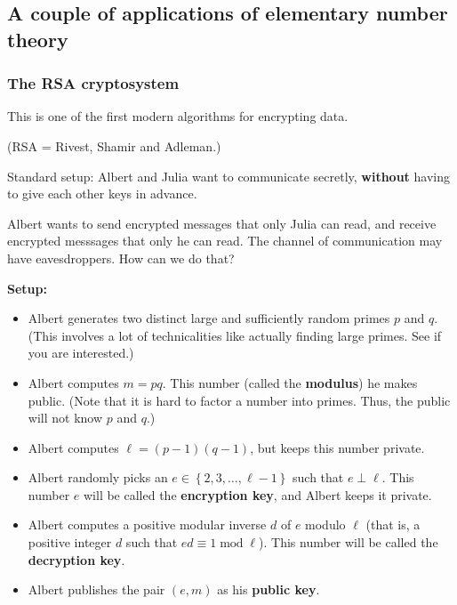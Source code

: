 \documentclass[numbers=enddot,12pt,final,onecolumn,notitlepage]{scrartcl}%
\numberwithin{exer}{subsection}
\theoremstyle{definition}
\begin{document}
\subsection{A couple of applications of elementary number theory}

\subsubsection{The RSA cryptosystem}

This is one of the first modern algorithms for encrypting data.

(RSA = Rivest, Shamir and Adleman.)

Standard setup: Albert and Julia want to communicate secretly,
\textbf{without} having to give each other keys in advance.

Albert wants to send encrypted messages that only Julia can read, and receive
encrypted messsages that only he can read. The channel of communication may
have eavesdroppers. How can we do that?

\textbf{Setup:}

\begin{itemize}
\item Albert generates two distinct large and sufficiently random primes $p$
and $q$. (This involves a lot of technicalities like actually finding large
primes. See \cite{Gallier-RSA} if you are interested.)

\item Albert computes $m=pq$. This number (called the \textbf{modulus}) he
makes public. (Note that it is hard to factor a number into primes. Thus, the
public will not know $p$ and $q$.)

\item Albert computes $\ell=\left(  p-1\right)  \left(  q-1\right)  $, but
keeps this number private.

\item Albert randomly picks an $e\in\left\{  2,3,\ldots,\ell-1\right\}  $ such
that $e\perp\ell$. This number $e$ will be called the \textbf{encryption key},
and Albert keeps it private.

\item Albert computes a positive modular inverse $d$ of $e$ modulo $\ell$
(that is, a positive integer $d$ such that $ed\equiv1\operatorname{mod}\ell$).
This number will be called the \textbf{decryption key}.

\item Albert publishes the pair $\left(  e,m\right)  $ as his \textbf{public
key}.
\end{itemize}
\end{document}
